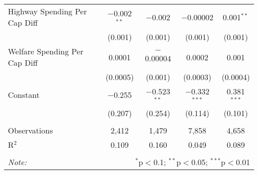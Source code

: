 \begin{table}[!htbp]
\begin{tabular}{@{\extracolsep{5pt}}lcccc}
  Highway Spending Per Cap Diff & $-$0.002$^{**}$ & $-$0.002 & $-$0.00002 & 0.001$^{**}$ \\ 
  & (0.001) & (0.001) & (0.001) & (0.001) \\ 
  Welfare Spending Per Cap Diff & 0.0001 & $-$0.00004 & 0.0002 & 0.001 \\ 
  & (0.0005) & (0.001) & (0.0003) & (0.0004) \\ 
  Constant & $-$0.255 & $-$0.523$^{**}$ & $-$0.332$^{***}$ & 0.381$^{***}$ \\ 
  & (0.207) & (0.254) & (0.114) & (0.101) \\ 
 \hline \\[-1.8ex] 
Observations & 2,412 & 1,479 & 7,858 & 4,658 \\ 
R$^{2}$ & 0.109 & 0.160 & 0.049 & 0.089 \\ 
\hline 
\hline \\[-1.8ex] 
\textit{Note:}  & \multicolumn{4}{r}{$^{*}$p$<$0.1; $^{**}$p$<$0.05; $^{***}$p$<$0.01} \\ 
\end{tabular} 
\end{table} 
